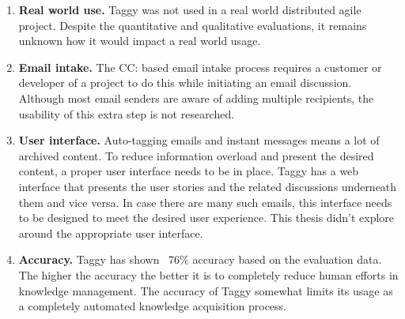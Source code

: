\begin{enumerate}
	\item \textbf{Real world use.} Taggy was not used in a real world distributed agile project. Despite the quantitative and qualitative evaluations, it remains unknown how it would impact a real world usage.
	\item \textbf{Email intake.} The CC: based email intake process requires a customer or developer of a project to do this while initiating an email discussion. Although most email senders are aware of adding multiple recipients, the usability of this extra step is not researched.
	\item \textbf{User interface.} Auto-tagging emails and instant messages means a lot of archived content. To reduce information overload and present the desired content, a proper user interface needs to be in place. Taggy has a web interface that presents the user stories and the related discussions underneath them and vice versa. In case there are many such emails, this interface needs to be designed to meet the desired user experience. This thesis didn't explore around the appropriate user interface.
	\item \textbf{Accuracy.} Taggy has shown ~76\% accuracy based on the evaluation data. The higher the accuracy the better it is to completely reduce human efforts in knowledge management. The accuracy of Taggy somewhat limits its usage as a completely automated knowledge acquisition process.
\end{enumerate}







